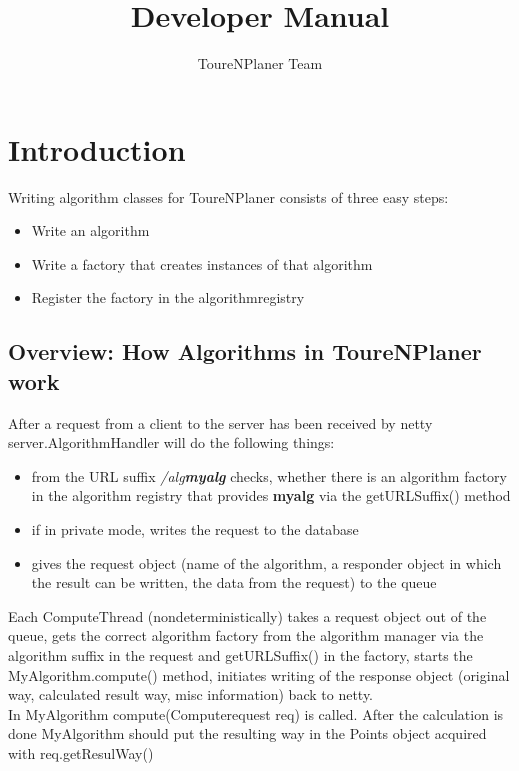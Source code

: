 \documentclass[ngerman,titlepage,parskip=true]{scrartcl}
\title{Developer Manual}
\author{ToureNPlaner Team}
\begin{document}
\maketitle

\tableofcontents

\pagebreak

\section{Introduction}

Writing algorithm classes for ToureNPlaner consists of three easy steps:
\begin{itemize}
  \item Write an algorithm
  \item Write a factory that creates instances of that algorithm
  \item Register the factory in the algorithmregistry
\end{itemize}


  \subsection{Overview: How Algorithms in ToureNPlaner work}
  After a request from a client to the server has been received by netty server.AlgorithmHandler will do the following things:
  \begin{itemize}
    \item from the URL suffix \textit{/alg\textbf{myalg}} checks, whether there is an algorithm factory in the algorithm registry that provides \textbf{myalg} via the getURLSuffix() method
    \item if in private mode, writes the request to the database
    \item gives the request object (name of the algorithm, a responder object in which the result can be written, the data from the request) to the queue
  \end{itemize}
  Each ComputeThread (nondeterministically) takes a request object out of the queue, gets the correct algorithm factory from the algorithm manager via the algorithm suffix in the request and getURLSuffix() in the factory, starts the MyAlgorithm.compute() method, initiates writing of the response object (original way, calculated result way, misc information) back to netty.\\
  In MyAlgorithm compute(Computerequest req) is called.  After the calculation is done MyAlgorithm should put the resulting way in the Points object acquired with req.getResulWay()
\end{document}
